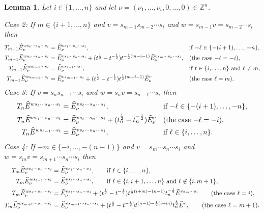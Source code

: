 \documentclass[11pt]{article}
\theoremstyle{plain}
\newtheorem{lemma}[thm]{Lemma}
\theoremstyle{definition}
\theoremstyle{remark}
\numberwithin{equation}{section}
\def\ZZ{\mathbb{Z}}
\newcounter{r}
\newcounter{s}
\begin{document}
\begin{lemma} \label{Tred}
Let $i\in \{1, \ldots, n\}$ and let $\nu = (\nu_1, \ldots, \nu_i, 0,\ldots, 0)\in \ZZ^n$. 

\smallskip\noindent
Case 2: If $m\in \{i+1, \ldots, n\}$ and $v= s_{m-1}s_{m-2}\cdots s_i$ and $w=s_{m-1}v=s_{m-2}\cdots s_i$ then
\begin{align*}
T_{m-1}\widehat{E}^{ws_\ell\cdots s_n\cdots s_i}_\nu
&= \widehat{E}^{vs_\ell \cdots s_n\cdots s_i}_\nu, 
&&\hbox{if $-\ell\in \{-(i+1), \ldots, -n\}$,}
\\
T_{m-1}\widehat{E}^{ws_i\cdots s_n\cdots s_i}_\nu
&=\widehat{E}^{vs_i\cdots s_n\cdots s_i}_\nu
+(t^{\frac12}-t^{-\frac12})t^{-\frac12(m-i-1)} \widehat{E}_\nu^{vs_m\cdots s_n \cdots s_i},
&&\hbox{(the case $-\ell=-i$)}, \\
T_{m-1}\widehat{E}^{ws_{\ell-1}\cdots s_i}_\nu
&= \widehat{E}^{vs_{\ell-1} \cdots  s_i}_\nu, &&\hbox{if $\ell\in \{i, \ldots, n\}$ and $\ell \ne m$},
\\
T_{m-1}\widehat{E}^{ws_{m-1}\cdots s_i}_\nu
&= \widehat{E}^{vs_{m-1} \cdots  s_i}_\nu+(t^{\frac12}-t^{-\frac12})t^{\frac12(m-i-1)}\widehat{E}^v_\nu &&\hbox{(the case $\ell=m$)}.
\end{align*}
Case 3: If $v= s_ns_{n-1}\cdots s_i$ and $w=s_nv=s_{n-1}\cdots s_i$ then
\begin{align*}
T_n\widehat{E}^{ws_\ell\cdots s_n \cdots s_i} &= \widehat{E}^{vs_\ell \cdots s_n \cdots s_i}_\nu, 
&&\hbox{if $-\ell\in \{-(i+1), \ldots, -n\}$,} 
\\
T_n\widehat{E}^{ws_i\cdots s_n\cdots s_i} &= \widehat{E}^{vs_i\cdots s_n \cdots s_i}_\nu
+(t_n^{\frac12}-t_n^{-\frac12})\widehat{E}^v_\nu
&&\hbox{(the case $-\ell=-i$),} 
\\
T_n\widehat{E}^{ws_{\ell-1} \cdots s_i} &= \widehat{E}^{vs_\ell \cdots s_n \cdots s_i}_\nu, 
&&\hbox{if $\ell\in \{i, \ldots, n\}$.} 
\end{align*}
Case 4: If $-m\in \{-i, \ldots, -(n-1)\}$ and $v=s_m\cdots s_n\cdots s_i$ and $w=s_m v=s_{m+1}\cdots s_n\cdots s_i$ then
\begin{align*}
T_m \widehat{E}^{ws_\ell\cdots s_n\cdots s_i}_\nu &= \widehat{E}^{vs_\ell\cdots s_n \cdots s_i}_\nu, 
\qquad\hbox{if $\ell\in \{i, \ldots, n\}$,} 
\\
T_m \widehat{E}^{ws_{\ell-1}\cdots s_i}_\nu &= \widehat{E}^{vs_\ell\cdots s_n \cdots s_i}_\nu, 
\qquad \hbox{if $\ell\in \{i,i+1, \ldots, n\}$ and $\ell\not\in \{ i,m+1\}$,} \\
T_m \widehat{E}^{ws_i\cdots s_n\cdots s_i}_\nu 
&= \widehat{E}^{vs_\ell\cdots s_n \cdots s_i}_\nu + (t^{\frac12}-t^{-\frac12})
t^{\frac12(i+m)-(n-1)}
t_n^{-\frac12}\widehat{E}^{vs_m\cdots s_i}
\qquad\hbox{(the case $\ell=i$),} \\
T_m \widehat{E}^{ws_{m+1}\cdots s_n\cdots s_i}_\nu 
&= \widehat{E}^{vs_{m+1}\cdots s_n \cdots s_i}_\nu 
+ (t^{\frac12}-t^{-\frac12}) t^{(n-1)-\frac12(i+m)}
t_n^{\frac12} \widehat{E}^v,
\qquad \hbox{(the case $\ell=m+1$).}
\end{align*}
\end{lemma}
\end{document}
